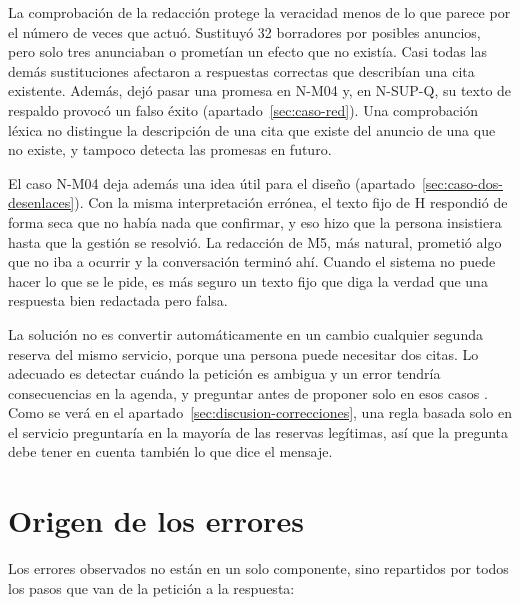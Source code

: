 La comprobación de la redacción protege la veracidad menos de lo que parece
por el número de veces que actuó. Sustituyó 32 borradores por posibles
anuncios, pero solo tres anunciaban o prometían un efecto que no existía. Casi
todas las demás sustituciones afectaron a respuestas correctas que describían
una cita existente. Además, dejó pasar una promesa en N-M04 y, en N-SUP-Q, su
texto de respaldo provocó un falso éxito (apartado~\ref{sec:caso-red}). Una
comprobación léxica no distingue la descripción de una cita que existe del
anuncio de una que no existe, y tampoco detecta las promesas en futuro.

El caso N-M04 deja además una idea útil para el diseño
(apartado~\ref{sec:caso-dos-desenlaces}). Con la misma interpretación errónea,
el texto fijo de H respondió de forma seca que no había nada que confirmar, y
eso hizo que la persona insistiera hasta que la gestión se resolvió. La
redacción de M5, más natural, prometió algo que no iba a ocurrir y la
conversación terminó ahí. Cuando el sistema no puede hacer lo que se le pide,
es más seguro un texto fijo que diga la verdad que una respuesta bien redactada
pero falsa.

La solución no es convertir automáticamente en un cambio cualquier segunda
reserva del mismo servicio, porque una persona puede necesitar dos citas. Lo
adecuado es detectar cuándo la petición es ambigua y un error tendría
consecuencias en la agenda, y preguntar antes de proponer solo en esos casos
\citep{zhang2025clarify}. Como se verá en el
apartado~\ref{sec:discusion-correcciones}, una regla basada solo en el servicio
preguntaría en la mayoría de las reservas legítimas, así que la pregunta debe
tener en cuenta también lo que dice el mensaje.

\section{Origen de los errores}
\label{sec:discusion-cadena}

Los errores observados no están en un solo componente, sino repartidos por
todos los pasos que van de la petición a la respuesta:

